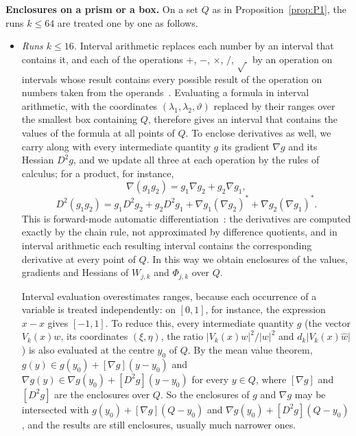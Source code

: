 \documentclass[11pt]{amsart}
\theoremstyle{definition}
\theoremstyle{remark}
\newcommand{\abs}[1]{\lvert #1\rvert}
\begin{document}
\medskip\noindent\textbf{Enclosures on a prism or a box.} On a set $Q$ as in Proposition~\ref{prop:P1}, the runs $k\le64$ are treated one by one as follows.
\begin{itemize}
\item \emph{Runs $k\le16$.} Interval arithmetic replaces each number by an interval that contains it, and each of the operations $+$, $-$, $\times$, $/$, $\sqrt{\ }$ by an operation on intervals whose result contains every possible result of the operation on numbers taken from the operands~\cite{MKC09}. Evaluating a formula in interval arithmetic, with the coordinates $(\lambda_1,\lambda_2,\vartheta)$ replaced by their ranges over the smallest box containing $Q$, therefore gives an interval that contains the values of the formula at all points of $Q$. To enclose derivatives as well, we carry along with every intermediate quantity $g$ its gradient $\nabla g$ and its Hessian $D^2g$, and we update all three at each operation by the rules of calculus; for a product, for instance,
\[
  \nabla(g_1g_2)=g_1\nabla g_2+g_2\nabla g_1,
  \]
  \[
  D^2(g_1g_2)=g_1D^2g_2+g_2D^2g_1+\nabla g_1(\nabla g_2)^*+\nabla g_2(\nabla g_1)^* .
\]
This is forward-mode automatic differentiation~\cite{GW08}: the derivatives are computed exactly by the chain rule, not approximated by difference quotients, and in interval arithmetic each resulting interval contains the corresponding derivative at every point of $Q$. In this way we obtain enclosures of the values, gradients and Hessians of $W_{j,k}$ and $\Phi_{j,k}$ over $Q$.

Interval evaluation overestimates ranges, because each occurrence of a variable is treated independently: on $[0,1]$, for instance, the expression $x-x$ gives $[-1,1]$. To reduce this, every intermediate quantity $g$ (the vector $V_k(x)w$, its coordinates $(\xi,\eta)$, the ratio $\abs{V_k(x)w}^2/\abs w^2$ and $d_k\abs{V_k(x)\hat w}$) is also evaluated at the centre $y_0$ of $Q$. By the mean value theorem, $g(y)\in g(y_0)+[\nabla g](y-y_0)$ and $\nabla g(y)\in\nabla g(y_0)+[D^2g](y-y_0)$ for every $y\in Q$, where $[\nabla g]$ and $[D^2g]$ are the enclosures over $Q$. So the enclosures of $g$ and $\nabla g$ may be intersected with $g(y_0)+[\nabla g](Q-y_0)$ and $\nabla g(y_0)+[D^2g](Q-y_0)$, and the results are still enclosures, usually much narrower ones.


\end{itemize}
\end{document}
